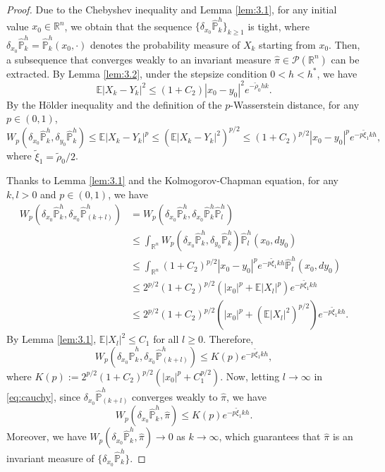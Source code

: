 \documentclass{article}
\begin{document}
\begin{proof}
Due to the Chebyshev inequality and Lemma \ref{lem:3.1}, for any initial value $x_0 \in \mathbb{R}^n$, we obtain that the sequence $\{\delta_{x_0} \hat{\mathbb{P}}_k^h\}_{k \geq 1}$ is tight, where $\delta_{x_0} \hat{\mathbb{P}}_k^h = \hat{\mathbb{P}}_k^h(x_0, \cdot)$ denotes the probability measure of $X_k$ starting from $x_0$. Then, a subsequence that converges weakly to an invariant measure $\hat{\pi} \in \mathcal{P}(\mathbb{R}^n)$ can be extracted. By Lemma \ref{lem:3.2}, under the stepsize condition $0 < h < h^*$, we have
\[
\mathbb{E}|X_k - Y_k|^2 \leq (1 + C_2)|x_0 - y_0|^2 e^{-\tilde{\rho}_0 h k}.
\]
By the H\"older inequality and the definition of the $p$-Wasserstein distance, for any $p \in (0, 1)$,
\begin{equation}\label{eq:contraction}
	W_p(\delta_{x_0} \hat{\mathbb{P}}_k^h, \delta_{y_0} \hat{\mathbb{P}}_k^h)
	\leq \mathbb{E}|X_k - Y_k|^p
	\leq \left(\mathbb{E}|X_k - Y_k|^2\right)^{p/2}
	\leq (1 + C_2)^{p/2} |x_0 - y_0|^p e^{-p \tilde{\xi}_1 k h},
\end{equation}
where $\tilde{\xi}_1 = \tilde{\rho}_0 / 2$.

Thanks to Lemma \ref{lem:3.1} and the Kolmogorov-Chapman equation, for any $k, l > 0$ and $p \in (0, 1)$, we have
\[
\begin{aligned}
	W_p(\delta_{x_0} \hat{\mathbb{P}}_k^h, \delta_{x_0} \hat{\mathbb{P}}_{(k+l)}^h)
	&= W_p(\delta_{x_0} \hat{\mathbb{P}}_k^h, \delta_{x_0} \hat{\mathbb{P}}_k^h \hat{\mathbb{P}}_l^h) \\
	&\leq \int_{\mathbb{R}^n} W_p(\delta_{x_0} \hat{\mathbb{P}}_k^h, \delta_{y_0} \hat{\mathbb{P}}_k^h) \hat{\mathbb{P}}_l^h(x_0, dy_0) \\
	&\leq \int_{\mathbb{R}^n} (1 + C_2)^{p/2} |x_0 - y_0|^p e^{-p \tilde{\xi}_1 k h} \hat{\mathbb{P}}_l^h(x_0, dy_0) \\
	&\leq 2^{p/2} (1 + C_2)^{p/2} \left(|x_0|^p + \mathbb{E}|X_l|^p\right) e^{-p \tilde{\xi}_1 k h} \\
	&\leq 2^{p/2} (1 + C_2)^{p/2} \left(|x_0|^p + (\mathbb{E}|X_l|^2)^{p/2}\right) e^{-p \tilde{\xi}_1 k h}.
\end{aligned}
\]
By Lemma \ref{lem:3.1}, $\mathbb{E}|X_l|^2 \leq C_1$ for all $l \geq 0$. Therefore,
\begin{equation}\label{eq:cauchy}
	W_p(\delta_{x_0} \hat{\mathbb{P}}_k^h, \delta_{x_0} \hat{\mathbb{P}}_{(k+l)}^h) \leq K(p) e^{-p \tilde{\xi}_1 k h},
\end{equation}
where $K(p) := 2^{p/2}(1 + C_2)^{p/2}\left(|x_0|^p + C_1^{p/2}\right)$. Now, letting $l \to \infty$ in \eqref{eq:cauchy}, since $\delta_{x_0} \hat{\mathbb{P}}_{(k+l)}^h$ converges weakly to $\hat{\pi}$, we have
\begin{equation}\label{eq:convergence}
	W_p(\delta_{x_0} \hat{\mathbb{P}}_k^h, \hat{\pi}) \leq K(p) e^{-p \tilde{\xi}_1 k h}.
\end{equation}
Moreover, we have $W_p(\delta_{x_0} \hat{\mathbb{P}}_k^h, \hat{\pi}) \to 0$ as $k \to \infty$, which guarantees that $\hat{\pi}$ is an invariant measure of $\{\delta_{x_0} \hat{\mathbb{P}}_k^h\}$.


\end{proof}
\end{document}
